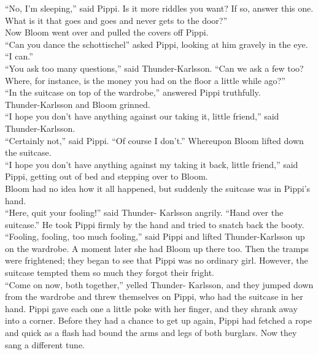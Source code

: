 \documentclass{standard}
\begin{document}
“No, I’m sleeping,” said Pippi. Is it more riddles you want? If so, answer this one. What is it that goes and goes and never gets to the door?”\\

Now Bloom went over and pulled the covers off Pippi.\\

“Can you dance the schottischel” asked Pippi, looking at him gravely in the eye. “I can.”\\

“You ask too many questions,” said Thunder-Karlsson. “Can we ask a few too? Where, for instance, is the money you had on the floor a little while ago?”\\

“In the suitcase on top of the wardrobe,” answered Pippi truthfully.\\

Thunder-Karlsson and Bloom grinned.\\

“I hope you don’t have anything against our taking it, little friend,” said Thunder-Karlsson.\\

“Certainly not,” said Pippi. “Of course I don’t.” Whereupon Bloom lifted down the suitcase.\\

“I hope you don’t have anything against my taking it back, little friend,” said Pippi, getting out of bed and stepping over to Bloom.\\

Bloom had no idea how it all happened, but suddenly the suitcase was in Pippi’s hand.\\

“Here, quit your fooling!” said Thunder- Karlsson angrily. “Hand over the suitcase.” He took Pippi firmly by the hand and tried to snatch back the booty.\\

“Fooling, fooling, too much fooling,” said Pippi and lifted Thunder-Karlsson up on the wardrobe. A moment later she had Bloom up there too. Then the tramps were frightened; they began to see that Pippi was no ordinary girl. However, the suitcase tempted them so much they forgot their fright.\\

“Come on now, both together,” yelled Thunder- Karlsson, and they jumped down from the wardrobe and threw themselves on Pippi, who had the suitcase in her hand. Pippi gave each one a little poke with her finger, and they shrank away into a corner. Before they had a chance to get up again, Pippi had fetched a rope and quick as a flash had bound the arms and legs of both burglars. Now they sang a different tune.\\
\end{document}
